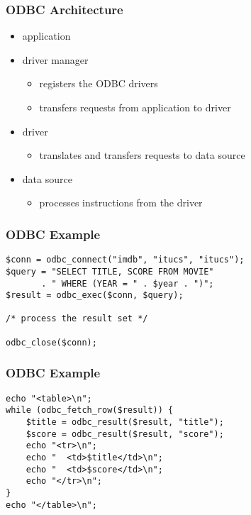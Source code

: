 \documentclass[dvipsnames]{beamer}
\theoremstyle{plain}
\begin{document}
\begin{frame}
  \frametitle{ODBC Architecture}

  \begin{itemize}
    \item application

    \pause
    \item driver manager
    \begin{itemize}
      \item registers the ODBC drivers
      \item transfers requests from application to driver
    \end{itemize}

    \pause
    \item driver
    \begin{itemize}
      \item translates and transfers requests to data source
    \end{itemize}

    \pause
    \item data source
    \begin{itemize}
      \item processes instructions from the driver
    \end{itemize}
  \end{itemize}
\end{frame}

\begin{frame}[fragile]
  \frametitle{ODBC Example}

  \begin{example}[PHP]
    \begin{lstlisting}[language=ExtendedPHP]
$conn = odbc_connect("imdb", "itucs", "itucs");
$query = "SELECT TITLE, SCORE FROM MOVIE"
       . " WHERE (YEAR = " . $year . ")";
$result = odbc_exec($conn, $query);

/* process the result set */

odbc_close($conn);
    \end{lstlisting}
  \end{example}
\end{frame}

\begin{frame}[fragile]
  \frametitle{ODBC Example}

  \begin{example}
    \begin{lstlisting}[language=ExtendedPHP]
echo "<table>\n";
while (odbc_fetch_row($result)) {
    $title = odbc_result($result, "title");
    $score = odbc_result($result, "score");
    echo "<tr>\n";
    echo "  <td>$title</td>\n";
    echo "  <td>$score</td>\n";
    echo "</tr>\n";
}
echo "</table>\n";
    \end{lstlisting}
  \end{example}
\end{frame}
\end{document}
